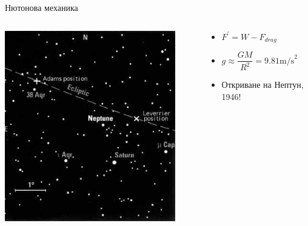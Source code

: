 \documentclass[10pt,a4paper]{beamer}
\begin{document}
        \begin{frame}{ Нютонова механика }
            \begin{columns}
                \begin{column}{0.5\textwidth}
                    \includegraphics[width=0.9\textwidth]{images/newton_neptune_discovery.png}
                \end{column}
                \begin{column}{0.5\textwidth}
                    \begin{itemize}
                        \item $ F^{\prime} = W - F_{drag} $
                        \item $ g \approx \dfrac{GM}{R^2} = 9.81 \mbox{m/s}^2 $
                        \item Откриване на Нептун, 1946!
                    \end{itemize}
                \end{column}
            \end{columns}
        \end{frame}
    
\end{document}
